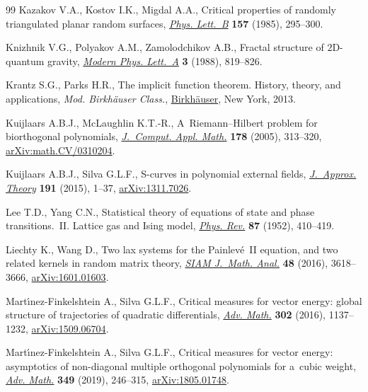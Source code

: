 \documentclass[pdftex]{sigma}
\numberwithin{equation}{section}
\begin{document}
\begin{thebibliography}{99}
Kazakov V.A., Kostov I.K., Migdal A.A., Critical properties of randomly
 triangulated planar random surfaces,
 \href{https://doi.org/10.1016/0370-2693(85)90669-0}{\textit{Phys. Lett.~B}}
 \textbf{157} (1985), 295--300.

Knizhnik V.G., Polyakov A.M., Zamolodchikov A.B., Fractal structure of
 {$2$}{D}-quantum gravity,
 \href{https://doi.org/10.1142/S0217732388000982}{\textit{Modern Phys.
 Lett.~A}} \textbf{3} (1988), 819--826.

Krantz S.G., Parks H.R., The implicit function theorem. History, theory, and
 applications, \textit{Mod. Birkh\"auser Class.},
 \href{https://doi.org/10.1007/978-1-4614-5981-1}{Birkh\"auser}, New York,
 2013.

Kuijlaars A.B.J., McLaughlin K.T.-R., A~{R}iemann--{H}ilbert problem for
 biorthogonal polynomials,
 \href{https://doi.org/10.1016/j.cam.2004.01.043}{\textit{J.~Comput. Appl.
 Math.}} \textbf{178} (2005), 313--320,
 \href{http://arxiv.org/abs/math.CV/0310204}{arXiv:math.CV/0310204}.

Kuijlaars A.B.J., Silva G.L.F., S-curves in polynomial external fields,
 \href{https://doi.org/10.1016/j.jat.2014.04.002}{\textit{J.~Approx. Theory}}
 \textbf{191} (2015), 1--37,
 \href{http://arxiv.org/abs/1311.7026}{arXiv:1311.7026}.

Lee T.D., Yang C.N., Statistical theory of equations of state and phase
 transitions.~{II}. {L}attice gas and {I}sing model,
 \href{https://doi.org/10.1103/PhysRev.87.410}{\textit{Phys. Rev.}}
 \textbf{87} (1952), 410--419.

Liechty K., Wang D., Two lax systems for the {P}ainlev\'e~{II} equation, and
 two related kernels in random matrix theory,
 \href{https://doi.org/10.1137/16M1056080}{\textit{SIAM J.~Math. Anal.}}
 \textbf{48} (2016), 3618--3666,
 \href{http://arxiv.org/abs/1601.01603}{arXiv:1601.01603}.

Mart\'{\i}nez-Finkelshtein A., Silva G.L.F., Critical measures for vector
 energy: global structure of trajectories of quadratic differentials,
 \href{https://doi.org/10.1016/j.aim.2016.08.009}{\textit{Adv. Math.}}
 \textbf{302} (2016), 1137--1232,
 \href{http://arxiv.org/abs/1509.06704}{arXiv:1509.06704}.

Mart\'{\i}nez-Finkelshtein A., Silva G.L.F., Critical measures for vector
 energy: asymptotics of non-diagonal multiple orthogonal polynomials for
 a~cubic weight, \href{https://doi.org/10.1016/j.aim.2019.04.010}{\textit{Adv.
 Math.}} \textbf{349} (2019), 246--315,
 \href{http://arxiv.org/abs/1805.01748}{arXiv:1805.01748}.


\end{thebibliography}
\end{document}
